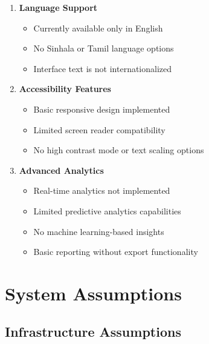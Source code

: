 \documentclass[11pt,a4paper]{article}
\begin{document}
\begin{enumerate}[leftmargin=*]
    \item \textbf{Language Support}
    \begin{itemize}
        \item Currently available only in English
        \item No Sinhala or Tamil language options
        \item Interface text is not internationalized
    \end{itemize}
    
    \item \textbf{Accessibility Features}
    \begin{itemize}
        \item Basic responsive design implemented
        \item Limited screen reader compatibility
        \item No high contrast mode or text scaling options
    \end{itemize}
    
    \item \textbf{Advanced Analytics}
    \begin{itemize}
        \item Real-time analytics not implemented
        \item Limited predictive analytics capabilities
        \item No machine learning-based insights
        \item Basic reporting without export functionality
    \end{itemize}
\end{enumerate}

\section{System Assumptions}

\subsection{Infrastructure Assumptions}
\end{document}
